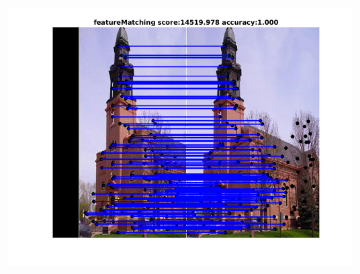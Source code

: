 \begin{figure}[h]
\begin{subfigure}[b]{0.33\textwidth}
		\includegraphics[scale=0.25]{"chapter3/fig/ImageTrafo/anchor_descr/using_cpd_afftrafo/fi_3_featureMatching"} 
	\end{subfigure} 	
	

\end{figure}
